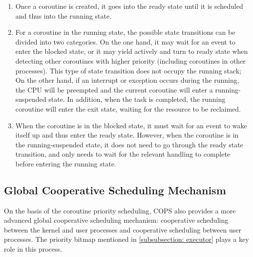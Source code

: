 \documentclass[sigconf,review,anonymous]{acmart}
\begin{document}
\begin{enumerate}[leftmargin=*]
    \item Once a coroutine is created, it goes into the ready state until it is scheduled and thus into the running state.
    \item For a coroutine in the running state, the possible state transitions can be divided into two categories. On the one hand, it may wait for an event to enter the blocked state, or it may yield actively and turn to ready state when detecting other coroutines with higher priority (including coroutines in other processes). This type of state transition does not occupy the running stack; On the other hand, if an interrupt or exception occurs during the running, the CPU will be preempted and the current coroutine will enter a running-suspended state. In addition, when the task is completed, the running coroutine will enter the exit state, waiting for the resource to be reclaimed.
    \item When the coroutine is in the blocked state, it must wait for an event to wake itself up and thus enter the ready state. However, when the coroutine is in the running-suspended state, it does not need to go through the ready state transition, and only needs to wait for the relevant handling to complete before entering the running state.
\end{enumerate}

\subsection{Global Cooperative Scheduling Mechanism}
\label{section: global-cooperative-scheduling}

On the basis of the coroutine priority scheduling, COPS also provides a more advanced global cooperative scheduling mechanism: cooperative scheduling between the kernel and user processes and cooperative scheduling between user processes. The priority bitmap mentioned in \ref{subsubsection: executor} plays a key role in this process.
\end{document}
